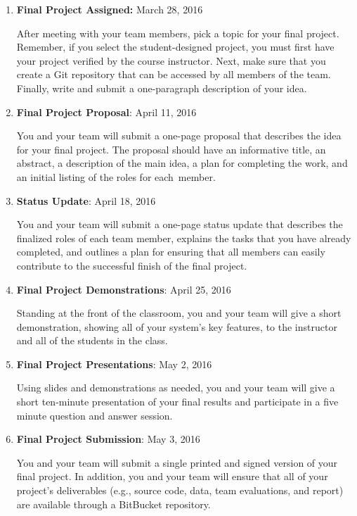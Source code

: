 \vspace*{-.05in}
\begin{enumerate}

  \itemsep0in

  \item {\bf Final Project Assigned:} March 28, 2016

    After meeting with your team members, pick a topic for your final project.  Remember, if you select the
    student-designed project, you must first have your project verified by the course instructor.  Next, make sure that
    you create a Git repository that can be accessed by all members of the team. Finally, write and submit a
    one-paragraph description of your idea.

  \item {\bf Final Project Proposal}: April 11, 2016

    You and your team will submit a one-page proposal that describes the idea for your final project.  The proposal
    should have an informative title, an abstract, a description of the main idea, a plan for completing the work, and
    an initial listing of the roles for \mbox{each member}.

  \item {\bf Status Update}: April 18, 2016

    You and your team will submit a one-page status update that describes the finalized roles of each team member,
    explains the tasks that you have already completed, and outlines a plan for ensuring that all members can easily
    contribute to the successful finish of the final project.

  \item {\bf Final Project Demonstrations}: April 25, 2016

    Standing at the front of the classroom, you and your team will give a short demonstration, showing all of your
    system's key features, to the instructor and all of the students in the class.

  \item {\bf Final Project Presentations}: May 2, 2016

    Using slides and demonstrations as needed, you and your team will give a short ten-minute presentation of your final
    results and participate in a five minute question and answer session.

  \item {\bf Final Project Submission}: May 3, 2016

    You and your team will submit a single printed and signed version of your final project. In addition, you and your
    team will ensure that all of your project's deliverables (e.g., source code, data, team evaluations, and report) are
    available through a BitBucket repository.

\end{enumerate}

